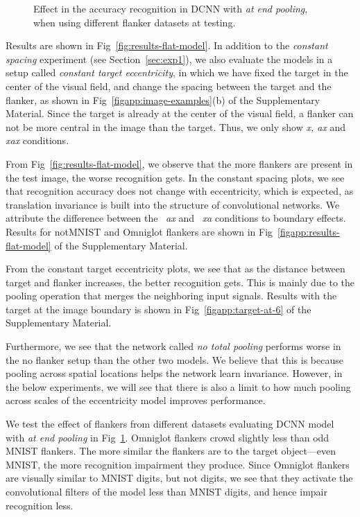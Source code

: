 \documentclass{article}
\begin{document}
\begin{figure}[t]
\begin{tabular}{m{3cm}m{3cm}m{3cm}m{3cm}}
\end{tabular}
\caption{\small{Effect in the accuracy recognition in DCNN with \emph{at end pooling}, when using different flanker datasets at testing.}\vspace*{-0.5cm}}
\label{fig:results-flanker-dset}
\end{figure}Results are shown in Fig~\ref{fig:results-flat-model}. In addition to the \emph{constant spacing} experiment (see Section~\ref{sec:exp1}), we also evaluate the models in a setup called \emph{constant target eccentricity}, in which we have fixed the target in the center of the visual field, and change the spacing between the target and the flanker, as shown in Fig~\ref{figapp:image-examples}(b) of the Supplementary Material.  Since the target is already at the center of the visual field, a flanker can not be more central in the image than the target.  Thus, we only show \emph{x, ax} and \emph{xax} conditions.

From Fig~\ref{fig:results-flat-model}, we observe that the more flankers are present in the test image, the worse recognition gets.  In the constant spacing plots, we see that recognition accuracy does not change with eccentricity, which is expected, as translation invariance is built into the structure of convolutional networks.  We attribute the difference between the ~\emph{ax} and ~\emph{xa} conditions to boundary effects. Results for notMNIST and Omniglot flankers are shown in Fig~\ref{figapp:results-flat-model} of the Supplementary Material.

From the constant target eccentricity plots, we see that as the distance between target and flanker increases, the better recognition gets. This is mainly due to the pooling operation that merges the neighboring input signals. Results with the target at the image boundary is shown in Fig~\ref{figapp:target-at-6} of the Supplementary Material.

Furthermore, we see that the network called \emph{no total pooling} performs worse in the no flanker setup than the other two models.  We believe that this is because pooling across spatial locations helps the network learn invariance.  However, in the below experiments, we will see that there is also a limit to how much pooling across scales of the eccentricity model improves performance. 

We test the effect of flankers from different datasets evaluating DCNN model with \emph{at end pooling} in Fig~\ref{fig:results-flanker-dset}.  Omniglot flankers crowd slightly less than odd MNIST flankers. The more similar the flankers are to the target object---even MNIST, the more recognition impairment they produce.  Since Omniglot flankers are visually similar to MNIST digits, but not digits, we see that they activate the convolutional filters of the model less than MNIST digits, and hence impair recognition less.
\end{document}
